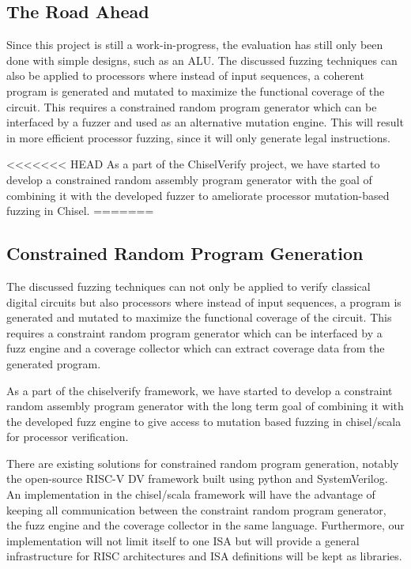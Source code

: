 \documentclass[conference]{IEEEtran}
\begin{document}
\subsection{The Road Ahead}
Since this project is still a work-in-progress, the evaluation has still only been done with simple designs, such as an ALU.
The discussed fuzzing techniques can also be applied to processors where instead of input sequences, a coherent program is generated and mutated to maximize the functional coverage of the circuit. 
This requires a constrained random program generator which can be interfaced by a fuzzer and used as an alternative mutation engine.
This will result in more efficient processor fuzzing, since it will only generate legal instructions. 

<<<<<<< HEAD
As a part of the ChiselVerify project, we have started to develop a constrained random assembly program generator with the goal of combining it with the developed fuzzer to ameliorate processor mutation-based fuzzing in Chisel.
=======
\subsection{Constrained Random Program Generation}

The discussed fuzzing techniques can not only be applied to verify classical digital circuits but also 
processors where instead of input sequences, a program is generated and mutated to maximize the 
functional coverage of the circuit. This requires a constraint random program generator which can 
be interfaced by a fuzz engine and a coverage collector which can extract coverage data from the 
generated program. 

As a part of the chiselverify framework, we have started to develop a constraint random assembly 
program generator with the long term goal of combining it with the developed fuzz engine to give 
access to mutation based fuzzing in chisel/scala for processor verification.

There are existing solutions for constrained random program generation, notably the open-source 
RISC-V DV framework \cite{riscvdv} built using python and SystemVerilog. An implementation in 
the chisel/scala framework will have the advantage of keeping all communication between the 
constraint random program generator, the fuzz engine and the coverage collector in the same 
language. Furthermore, our implementation will not limit itself to one ISA but will provide 
a general infrastructure for RISC architectures and ISA definitions will be kept as libraries.
\end{document}
